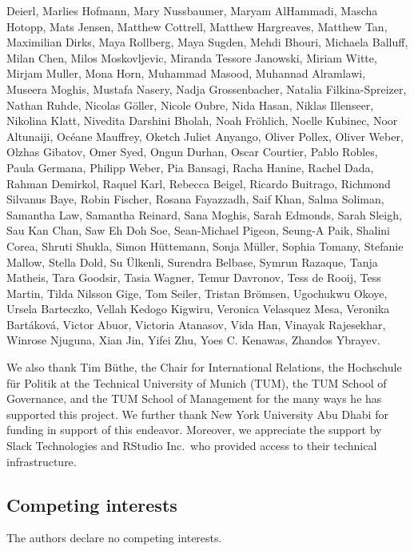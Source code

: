 \documentclass[
]{article}
\begin{document}
Deierl, Marlies Hofmann, Mary Nussbaumer, Maryam AlHammadi, Mascha Hotopp, Mats Jensen, Matthew Cottrell, Matthew Hargreaves, Matthew Tan, Maximilian Dirks, Maya Rollberg, Maya Sugden, Mehdi Bhouri, Michaela Balluff, Milan Chen, Milos Moskovljevic, Miranda Tessore Janowski, Miriam Witte, Mirjam Muller, Mona Horn, Muhammad Masood, Muhannad Alramlawi, Museera Moghis, Mustafa Nasery, Nadja Grossenbacher, Natalia Filkina-Spreizer, Nathan Ruhde, Nicolas Göller, Nicole Oubre, Nida Hasan, Niklas Illenseer, Nikolina Klatt, Nivedita Darshini Bholah, Noah Fröhlich, Noelle Kubinec, Noor Altunaiji, Océane Mauffrey, Oketch Juliet Anyango, Oliver Pollex, Oliver Weber, Olzhas Gibatov, Omer Syed, Ongun Durhan, Oscar Courtier, Pablo Robles, Paula Germana, Philipp Weber, Pia Bansagi, Racha Hanine, Rachel Dada, Rahman Demirkol, Raquel Karl, Rebecca Beigel, Ricardo Buitrago, Richmond Silvanus Baye, Robin Fischer, Rosana Fayazzadh, Saif Khan, Salma Soliman, Samantha Law, Samantha Reinard, Sana Moghis, Sarah Edmonds, Sarah Sleigh, Sau Kan Chan, Saw Eh Doh Soe, Sean-Michael Pigeon, Seung-A Paik, Shalini Corea, Shruti Shukla, Simon Hüttemann, Sonja Müller, Sophia Tomany, Stefanie Mallow, Stella Dold, Su Ülkenli, Surendra Belbase, Symrun Razaque, Tanja Matheis, Tara Goodsir, Tasia Wagner, Temur Davronov, Tess de Rooij, Tess Martin, Tilda Nilsson Gige, Tom Seiler, Tristan Brömsen, Ugochukwu Okoye, Ursela Barteczko, Vellah Kedogo Kigwiru, Veronica Velasquez Mesa, Veronika Bartáková, Victor Abuor, Victoria Atanasov, Vida Han, Vinayak Rajesekhar, Winrose Njuguna, Xian Jin, Yifei Zhu, Yoes C. Kenawas, Zhandos Ybrayev.

We also thank Tim Büthe, the Chair for International Relations, the Hochschule für Politik at the Technical University of Munich (TUM), the TUM School of Governance, and the TUM School of Management for the many ways he has supported this project. We further thank New York University Abu Dhabi for funding in support of this endeavor. Moreover, we appreciate the support by Slack Technologies and RStudio Inc.~who provided access to their technical infrastructure.

\hypertarget{competing-interests}{%
\subsection*{Competing interests}\label{competing-interests}}

The authors declare no competing interests.
\end{document}
